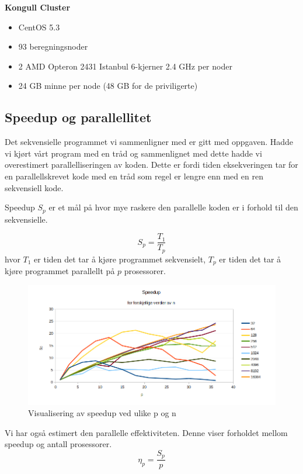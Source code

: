 \documentclass[11pt,norsk,a4paper]{article}
\begin{document}
\begin{shaded}
\textbf{Kongull Cluster}\\
\begin{itemize} 
\item{CentOS 5.3}
\item{93 beregningsnoder}
\item{2 AMD Opteron 2431 Istanbul 6-kjerner 2.4 GHz per noder}
\item{24 GB minne per node (48 GB for de priviligerte)}
\end{itemize}
\end{shaded}

\subsection{Speedup og parallellitet}
Det sekvensielle programmet vi sammenligner med er gitt med oppgaven. Hadde vi kjørt vårt program med en tråd og sammenlignet med dette hadde vi overestimert parallelliseringen av koden. Dette er fordi tiden eksekveringen tar for en parallellskrevet kode med en tråd som regel er lengre enn med en ren sekvensiell kode. 

Speedup $S_p$ er et mål på hvor mye raskere den parallelle koden er i forhold til den sekvensielle. 

$$ S_p = \frac{T_1}{T_p}$$
hvor $T_1$ er tiden det tar å kjøre programmet sekvensielt, $T_p$ er tiden det tar å kjøre programmet parallellt på $p$ prosessorer. 

\begin{figure}[h]
\centering
\includegraphics[scale=0.425]{plot_speedup.png}
\caption{Visualisering av speedup ved ulike p og n}
\end{figure}

Vi har også estimert den parallelle effektiviteten. Denne viser forholdet mellom speedup og antall prosessorer. 
$$ \eta_p = \frac{S_p}{p}$$
\end{document}
